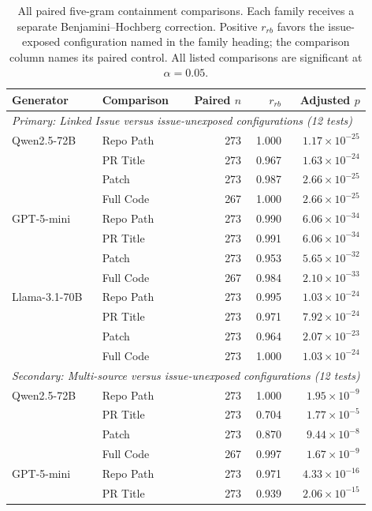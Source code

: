 \documentclass[11pt,a4paper]{article}
\begin{document}
\begin{table}[htbp]
\centering
\caption{All paired five-gram containment comparisons. Each family receives a separate Benjamini--Hochberg correction. Positive $r_{rb}$ favors the issue-exposed configuration named in the family heading; the comparison column names its paired control. All listed comparisons are significant at $\alpha=0.05$.}
\label{tab:issue_reuse_paired}
\small
\setlength{\tabcolsep}{5pt}
\begin{tabular}{llrrr}
\toprule
Generator & Comparison & Paired $n$ & $r_{rb}$ & Adjusted $p$ \\
\midrule
\multicolumn{5}{l}{\textit{Primary: Linked Issue versus issue-unexposed configurations (12 tests)}} \\
Qwen2.5-72B & Repo Path & 273 & 1.000 & $1.17\times10^{-25}$ \\
 & PR Title & 273 & 0.967 & $1.63\times10^{-24}$ \\
 & Patch & 273 & 0.987 & $2.66\times10^{-25}$ \\
 & Full Code & 267 & 1.000 & $2.66\times10^{-25}$ \\
GPT-5-mini & Repo Path & 273 & 0.990 & $6.06\times10^{-34}$ \\
 & PR Title & 273 & 0.991 & $6.06\times10^{-34}$ \\
 & Patch & 273 & 0.953 & $5.65\times10^{-32}$ \\
 & Full Code & 267 & 0.984 & $2.10\times10^{-33}$ \\
Llama-3.1-70B & Repo Path & 273 & 0.995 & $1.03\times10^{-24}$ \\
 & PR Title & 273 & 0.971 & $7.92\times10^{-24}$ \\
 & Patch & 273 & 0.964 & $2.07\times10^{-23}$ \\
 & Full Code & 273 & 1.000 & $1.03\times10^{-24}$ \\
\midrule
\multicolumn{5}{l}{\textit{Secondary: Multi-source versus issue-unexposed configurations (12 tests)}} \\
Qwen2.5-72B & Repo Path & 273 & 1.000 & $1.95\times10^{-9}$ \\
 & PR Title & 273 & 0.704 & $1.77\times10^{-5}$ \\
 & Patch & 273 & 0.870 & $9.44\times10^{-8}$ \\
 & Full Code & 267 & 0.997 & $1.67\times10^{-9}$ \\
GPT-5-mini & Repo Path & 273 & 0.971 & $4.33\times10^{-16}$ \\
 & PR Title & 273 & 0.939 & $2.06\times10^{-15}$ \\

\end{tabular}
\end{table}
\end{document}
